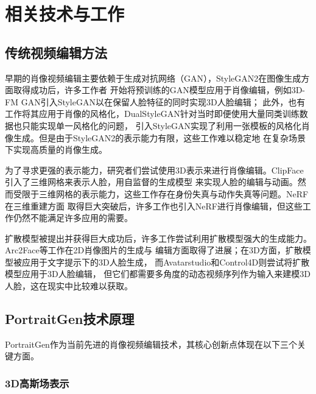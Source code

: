 \chapter{相关技术与工作}

\section{传统视频编辑方法}

早期的肖像视频编辑主要依赖于生成对抗网络（GAN），StyleGAN2\cite{karras2020analyzing}在图像生成方面取得成功后，许多工作者
开始将预训练的GAN模型应用于肖像编辑，例如3D-FM GAN\cite{liu20223d}引入StyleGAN以在保留人脸特征的同时实现3D人脸编辑；
此外，也有工作将其应用于肖像的风格化，DualStyleGAN\cite{yang2022pastiche}针对当时即便使用大量同类训练数据也只能实现单一风格化的问题，
引入StyleGAN实现了利用一张模板的风格化肖像生成。但是由于StyleGAN2的表示能力有限，这些工作难以稳定地
在复杂场景下实现高质量的肖像生成。

为了寻求更强的表示能力，研究者们尝试使用3D表示来进行肖像编辑。ClipFace\cite{aneja2023clipface}引入了三维网格来表示人脸，用自监督的生成模型
来实现人脸的编辑与动画。然而受限于三维网格的表示能力，这些工作存在身份失真与动作失真等问题。NeRF\cite{mildenhall2021nerf}在三维重建方面
取得巨大突破后，许多工作\cite{abdal20233davatargan}\cite{bao2024geneavatar}\cite{sun2023next3d}也引入NeRF进行肖像编辑，但这些工作仍然不能满足许多应用的需要。

扩散模型被提出并获得巨大成功后，许多工作尝试利用扩散模型强大的生成能力。Arc2Face\cite{papantoniou2024arc2face}等工作在2D肖像图片的生成与
编辑方面取得了进展；在3D方面，扩散模型被应用于文字提示下的3D人脸生成\cite{han2023headsculpt}\cite{zhang2023dreamface}，
而Avatarstudio\cite{mendiratta2023avatarstudio}和Control4D\cite{shao2024control4d}则尝试将扩散模型应用于3D人脸编辑，
但它们都需要多角度的动态视频序列作为输入来建模3D人脸，这在现实中比较难以获取。

\section{PortraitGen技术原理}

PortraitGen作为当前先进的肖像视频编辑技术，其核心创新点体现在以下三个关键方面。

\subsection{3D高斯场表示}

